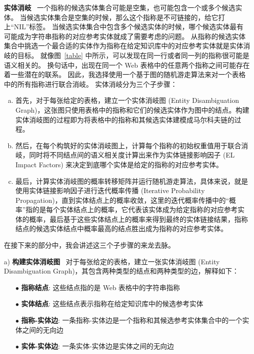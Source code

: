 \noindent\textbf{实体消岐} \ 
一个指称的候选实体集合可能是空集，也可能包含一个或多个候选实体。
当候选实体集合是空集的时候，那么这个指称是不可链接的，给它打上``NIL''标签。
当候选实体集合中包含多个候选实体的时候，哪个候选实体最有可能成为字符串指称的对应参考实体就成了需要考虑的问题。
从指称的候选实体集合中挑选一个最合适的实体作为指称在给定知识库中的对应参考实体就是实体消岐的目标。
就像图~\ref{table} 中所示，可以发现在同一行或者同一列的指称很可能是语义相关的。
换句话中，出现在同一个 Web 表格中的任意两个指称之间可能存在着一些潜在的联系。
因此，我选择使用一个基于图的随机游走算法来对一个表格中的所有指称进行联合消岐。
实体消岐分为三个子步骤：
\begin{enumerate}[a)]
\item 首先，对于每张给定的表格，建立一个实体消岐图 (Entity Disambiguation Graph)，这张图只使用表格中的指称和它们的候选实体作为图中的结点。构建实体消岐图的过程即为将表格中的指称和其候选实体建模成马尔科夫链的过程。
\item 然后，在每个构筑好的实体消岐图上，计算每个指称的初始权重值用于联合消岐，同时将不同结点间的语义相关度计算出来作为实体链接影响因子 (EL Impact Factors) 来决定到底哪个实体是给定的指称的对应参考实体。
\item 最后，计算实体消岐图的概率转移矩阵并运行随机游走算法，具体来说，就是使用实体链接影响因子进行迭代概率传播 (Iterative Probability Propagation)，直到实体结点上的概率收敛，这里的迭代概率传播中的``概率''指的是每个实体结点上的概率，它代表该实体成为给定指称的对应参考实体的概率，最后基于这些实体结点上的概率来得到最终的实体链接结果，指称结点的候选实体结点中概率最高的结点胜出成为指称的对应参考实体。
\end{enumerate}


\noindent\newline 在接下来的部分中，我会讲述这三个子步骤的来龙去脉。

a) \textbf{构建实体消岐图} \ 
对于每张给定的表格，建立一张实体消岐图 (Entity Disambiguation Graph)，其包含两种类型的结点和两种类型的边，解释如下：
\begin{itemize}
  \item[$\bullet$] \textbf{指称结点}: 这些结点指的是 Web 表格中的字符串指称
  \item[$\bullet$] \textbf{实体结点}: 这些结点表示指称在给定知识库中的候选参考实体
  \item[$\bullet$] \textbf{指称-实体边}: 一条指称-实体边是一个指称和其候选参考实体集合中的一个实体之间的无向边
  \item[$\bullet$] \textbf{实体-实体边}: 一条实体-实体边是实体之间的无向边
\end{itemize}

